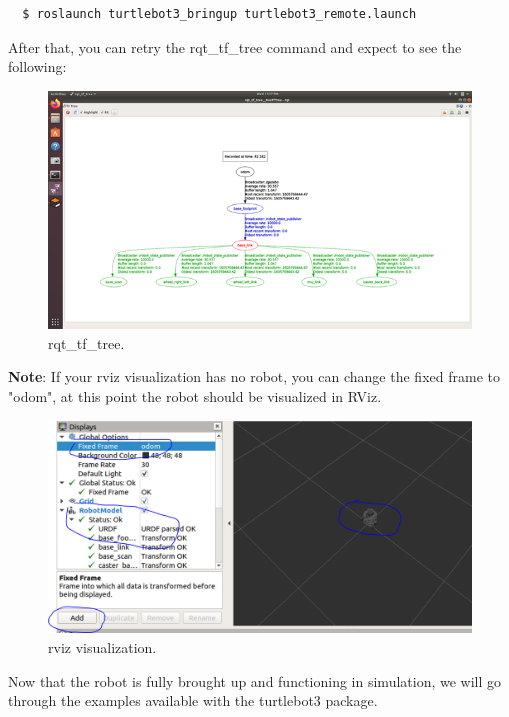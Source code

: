 \documentclass[12pt]{article}
\begin{document}
\begin{enumerate}
\begin{verbatim}
  $ roslaunch turtlebot3_bringup turtlebot3_remote.launch
\end{verbatim}

After that, you can retry the rqt\_tf\_tree command and expect to see the following:
\begin{figure}[H]
  \vspace{-10pt}
  \centering\includegraphics[width=14cm]{lab1figure/rqf.png}\vspace{-10pt}
  \caption{rqt\_tf\_tree.}\label{fig:rqt}
  \end{figure}

\textbf{Note}: If your rviz visualization has no robot, you can change the fixed frame to "odom", at this point the robot should be visualized in RViz.
\begin{figure}[H]
  \vspace{-10pt}
  \centering\includegraphics[width=14cm]{lab1figure/rviz.png}\vspace{-10pt}
  \caption{rviz visualization.}\label{fig:rqt1}
  \end{figure}

Now that the robot is fully brought up and functioning in simulation, we will go through the examples available with the turtlebot3 package.

\end{enumerate}
\end{document}
